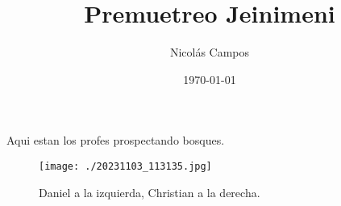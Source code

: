 \documentclass[11pt]{article}
\author{Nicolás Campos}
\date{\today}
\title{Premuetreo Jeinimeni}
\begin{document}
\maketitle
\tableofcontents

Aqui estan los profes prospectando bosques.
\begin{figure}[htbp]
\centering
\texttt{[image: ./20231103\_113135.jpg]}
\caption{Daniel a la izquierda, Christian a la derecha.}
\end{figure}
\end{document}
